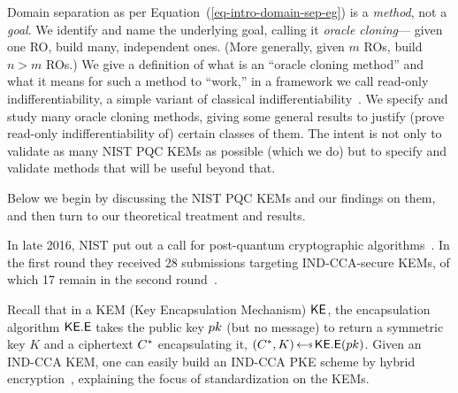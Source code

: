 Domain separation as per Equation~(\ref{eq-intro-domain-sep-eg}) is a \textit{method}, not a \textit{goal}. We identify and name the underlying goal, calling it \textit{oracle cloning}--- given one RO, build many, independent ones. (More generally, given $m$ ROs, build $n>m$ ROs.) We give a definition of what is an ``oracle cloning method'' and what it means for such a method to ``work,'' in a framework we call read-only indifferentiability, a simple variant of classical indifferentiability~\cite{TCC:MauRenHol04}.
We specify and study many oracle cloning methods, giving some general results to justify (prove read-only indifferentiability of) certain classes of them. The intent is not only to validate as many NIST PQC KEMs as possible (which we do) but to specify and validate methods that will be useful beyond that. 

Below we begin by discussing the NIST PQC KEMs and our findings on them, and then turn to our theoretical treatment and results.


 





 In late 2016, NIST put out a call for post-quantum cryptographic algorithms~\cite{NIST-PQC}. In the first round they received 28 submissions targeting IND-CCA-secure KEMs, of which 17 remain in the second round~\cite{NIST-PQC-round2}.

Recall that in a KEM (Key Encapsulation Mechanism) ${\mathsf{KE}}$, the encapsulation algorithm $\mathsf{{\mathsf{KE}}.E}$ takes the public key $pk$ (but no message) to return a symmetric key $K$ and a ciphertext $C^*$ encapsulating it, $(\kemCiph,K)\getsr\kemEnc(\pk)$. Given an IND-CCA KEM, one can easily build an IND-CCA PKE scheme by hybrid encryption~\cite{CraSho03}, explaining the focus of standardization on the KEMs. 




